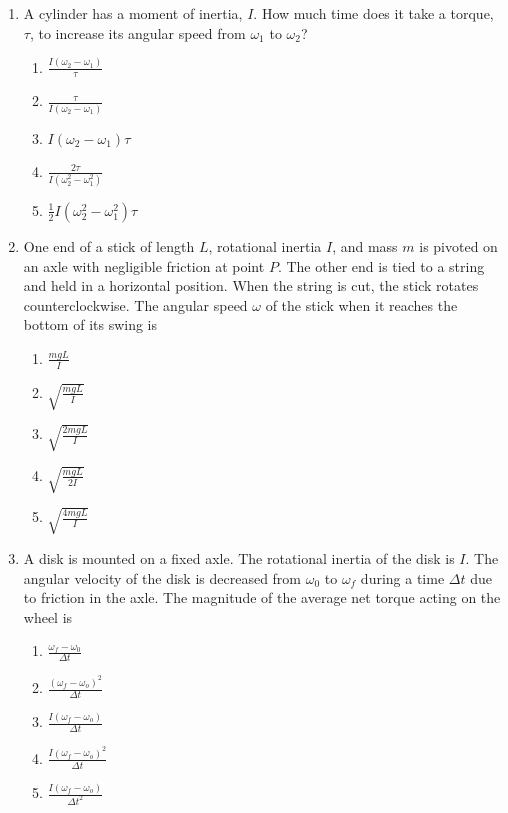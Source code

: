 \documentclass{../../../oss-apphys}
\begin{document}
\begin{multicols}{2}
\begin{enumerate}[leftmargin=18pt]
  \item A cylinder has a moment of inertia, $I$. How much time does it take a
    torque, $\tau$, to increase its angular speed from $\omega_1$ to
    $\omega_2$?
    \begin{enumerate}[nosep,leftmargin=18pt,label=(\Alph*)]
    \item $\displaystyle\frac{I(\omega_2-\omega_1)}{\tau}$
    \item $\displaystyle\frac{\tau}{I(\omega_2-\omega_1)}$
    \item $\displaystyle I(\omega_2-\omega_1)\tau$
    \item $\displaystyle\frac{2\tau}{I(\omega_2^2-\omega_1^2)}$
    \item $\displaystyle\frac12I(\omega_2^2-\omega_1^2)\tau$
    \end{enumerate}
    \columnbreak
    
  \item One end of a stick of length $L$, rotational inertia $I$, and mass $m$
    is pivoted on an axle with negligible friction at point $P$. The other end
    is tied to a string and held in a horizontal position. When the string is
    cut, the stick rotates counterclockwise. The angular speed $\omega$ of the
    stick when it reaches the bottom of its swing is
    \begin{center}
    \end{center}
    \begin{enumerate}[nosep,leftmargin=18pt,label=(\Alph*)]
    \item$\displaystyle\frac{mgL}{I}$
    \item$\displaystyle\sqrt{\frac{mgL}{I}}$
    \item$\displaystyle\sqrt{\frac{2mgL}{I}}$
    \item$\displaystyle\sqrt{\frac{mgL}{2I}}$
    \item$\displaystyle\sqrt{\frac{4mgL}{I}}$
    \end{enumerate}
    
  \item A disk is mounted on a fixed axle. The rotational inertia of the disk is
    $I$. The angular velocity of the disk is decreased from $\omega_0$ to
    $\omega_f$ during a time $\Delta t$ due to friction in the axle. The
    magnitude of the average net torque acting on the wheel is
    \begin{enumerate}[noitemsep,topsep=0pt,leftmargin=18pt,label=(\Alph*)]
    \item $\displaystyle\frac{\omega_f-\omega_0}{\Delta t}$
    \item $\displaystyle\frac{(\omega_f-\omega_o)^2}{\Delta t}$
    \item $\displaystyle\frac{I(\omega_f-\omega_o)}{\Delta t}$
    \item $\displaystyle\frac{I(\omega_f-\omega_o)^2}{\Delta t}$
    \item $\displaystyle\frac{I(\omega_f-\omega_o)}{\Delta t^2}$
    \end{enumerate}
    \columnbreak
    

\end{enumerate}
\end{multicols}
\end{document}
